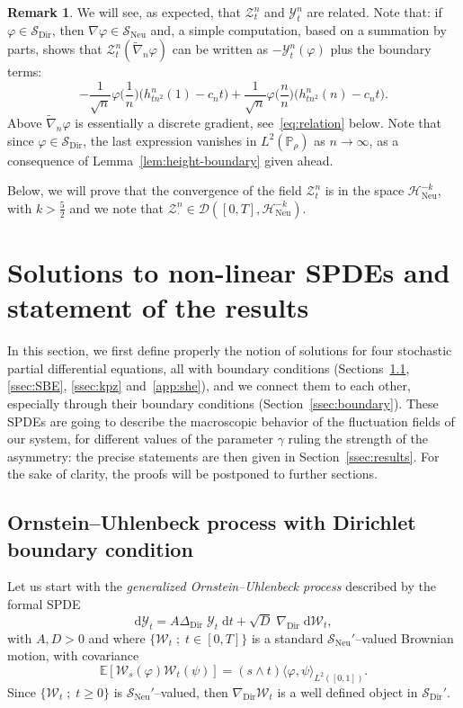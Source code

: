 \documentclass[10pt]{amsart}
\theoremstyle{definition}\newtheorem{defi}[theo]{Definition}\newtheorem{rema}[theo]{Remark}\newtheorem{exam}[theo]{Example}\newtheorem{exem}[theo]{Example}\newtheorem{nota}[theo]{Notation}
\DeclareMathOperator{\Dir}{Dir}
\DeclareMathOperator{\Neu}{Neu}
\newcommand{\bb}[1]{{\mathbb #1}}
\newcommand{\mc}[1]{{\mathcal #1}}
\renewcommand{\mc}[1]{{\mathcal #1}}
\newcommand{\SD}{\ensuremath{\mc S_{\Dir}}}
\newcommand{\SN}{\ensuremath{\mc S_{\Neu}}}
\renewcommand{\geq}{\geqslant}
\renewcommand{\tilde}{\widetilde}
\newcommand*{\dd}{\mathrm{d}}
\newcommand*{\dt}{\dd t}
\renewcommand{\tfrac}{\frac}
\begin{document}
\begin{rema}
We will see, as expected, that $\mc Z_t^n$ and $\mc Y_t^n$ are related. Note that: if $\varphi \in\SD$, then $\nabla\varphi \in \SN$ and, a simple computation, based on a summation by parts, shows that $\mc Z_t^n(\tilde \nabla_n \varphi)$ can be written as $-\mc Y_t^n(\varphi)$ plus the boundary terms:
\[
-\tfrac{1}{\sqrt n}\varphi\bigg(\tfrac1n\bigg)\big(h_{tn^2}^n(1)-c_nt\big) + \tfrac{1}{\sqrt n}\varphi\bigg(\tfrac n n\bigg)\big(h_{tn^2}^n(n)-c_nt\big).
\]
Above $\tilde \nabla_n \varphi$ is essentially a discrete gradient, see~\eqref{eq:relation} below. Note that since $\varphi \in\SD$, the last expression vanishes in $ L^2(\bb P_\rho)$ as $n\to\infty$, as a consequence of Lemma~\ref{lem:height-boundary} given ahead.
\end{rema}

Below, we will prove that the convergence of the field $\mc Z_t^n$ is in the space $\mc H_{\Neu}^{-k}$, with $k>\frac52$ and we note that $\mc Z^n_\cdot \in \mathcal{D}([0,T], \mathcal{H}_{\Neu}^{-k})$.


\section{Solutions to non-linear SPDEs and statement of the results}\label{s3}

In this section, we first define properly the notion of solutions for four stochastic partial differential equations, all with boundary conditions (Sections~\ref{ssec:0U}, \ref{ssec:SBE}, \ref{ssec:kpz} and~\ref{app:she}), and we connect them to each other, especially through their boundary conditions (Section~\ref{ssec:boundary}). These SPDEs are going to describe the macroscopic behavior of the fluctuation fields of our system, for different values of the parameter $\gamma$ ruling the strength of the asymmetry: the precise statements are then given in Section~\ref{ssec:results}. For the sake of clarity, the proofs will be postponed to further sections.

\subsection{Ornstein--Uhlenbeck process with Dirichlet boundary condition}\label{ssec:0U}

Let us start with the \emph{generalized Ornstein--Uhlenbeck process} described by the formal SPDE
\begin{equation}\label{eq:OU}
\dd\mathcal Y_t = A\Delta_{\Dir} \;\mathcal Y_t \;\dt + \sqrt{D}\; \nabla_{\Dir} \;\dd\mc W_t,
\end{equation}
with $A,D > 0$ and where $\{\mc W_t \; ; \; t\in [0,T]\}$ is a standard $\SN'$--valued Brownian motion, with covariance
\begin{equation}\label{eq:Bm-cov}
\bb E[\mc W_s(\varphi) \mc W_t(\psi)] = (s \wedge t) \langle \varphi,\psi \rangle_{L^2([0,1])}.
\end{equation}
Since $\{\mc W_t\; ; \; t\geq 0\}$ is $\SN'$--valued, then $\nabla_{\Dir}\mc W_t$ is a well defined object in $\SD'$.
\end{document}
